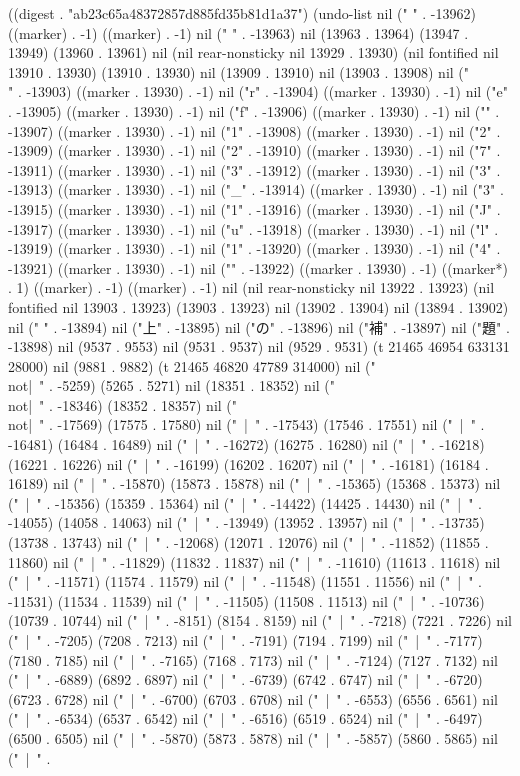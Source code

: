 
((digest . "ab23c65a48372857d885fd35b81d1a37") (undo-list nil ("
" . -13962) ((marker) . -1) ((marker) . -1) nil (" " . -13963) nil (13963 . 13964) (13947 . 13949) (13960 . 13961) nil (nil rear-nonsticky nil 13929 . 13930) (nil fontified nil 13910 . 13930) (13910 . 13930) nil (13909 . 13910) nil (13903 . 13908) nil ("\\" . -13903) ((marker . 13930) . -1) nil ("r" . -13904) ((marker . 13930) . -1) nil ("e" . -13905) ((marker . 13930) . -1) nil ("f" . -13906) ((marker . 13930) . -1) nil ("{" . -13907) ((marker . 13930) . -1) nil ("1" . -13908) ((marker . 13930) . -1) nil ("2" . -13909) ((marker . 13930) . -1) nil ("2" . -13910) ((marker . 13930) . -1) nil ("7" . -13911) ((marker . 13930) . -1) nil ("3" . -13912) ((marker . 13930) . -1) nil ("3" . -13913) ((marker . 13930) . -1) nil ("_" . -13914) ((marker . 13930) . -1) nil ("3" . -13915) ((marker . 13930) . -1) nil ("1" . -13916) ((marker . 13930) . -1) nil ("J" . -13917) ((marker . 13930) . -1) nil ("u" . -13918) ((marker . 13930) . -1) nil ("l" . -13919) ((marker . 13930) . -1) nil ("1" . -13920) ((marker . 13930) . -1) nil ("4" . -13921) ((marker . 13930) . -1) nil ("}" . -13922) ((marker . 13930) . -1) ((marker*) . 1) ((marker) . -1) ((marker) . -1) nil (nil rear-nonsticky nil 13922 . 13923) (nil fontified nil 13903 . 13923) (13903 . 13923) nil (13902 . 13904) nil (13894 . 13902) nil (" " . -13894) nil ("上" . -13895) nil ("の" . -13896) nil ("補" . -13897) nil ("題" . -13898) nil (9537 . 9553) nil (9531 . 9537) nil (9529 . 9531) (t 21465 46954 633131 28000) nil (9881 . 9882) (t 21465 46820 47789 314000) nil ("\\not|~" . -5259) (5265 . 5271) nil (18351 . 18352) nil ("\\not|~" . -18346) (18352 . 18357) nil ("\\not|~" . -17569) (17575 . 17580) nil ("~|~" . -17543) (17546 . 17551) nil ("~|~" . -16481) (16484 . 16489) nil ("~|~" . -16272) (16275 . 16280) nil ("~|~" . -16218) (16221 . 16226) nil ("~|~" . -16199) (16202 . 16207) nil ("~|~" . -16181) (16184 . 16189) nil ("~|~" . -15870) (15873 . 15878) nil ("~|~" . -15365) (15368 . 15373) nil ("~|~" . -15356) (15359 . 15364) nil ("~|~" . -14422) (14425 . 14430) nil ("~|~" . -14055) (14058 . 14063) nil ("~|~" . -13949) (13952 . 13957) nil ("~|~" . -13735) (13738 . 13743) nil ("~|~" . -12068) (12071 . 12076) nil ("~|~" . -11852) (11855 . 11860) nil ("~|~" . -11829) (11832 . 11837) nil ("~|~" . -11610) (11613 . 11618) nil ("~|~" . -11571) (11574 . 11579) nil ("~|~" . -11548) (11551 . 11556) nil ("~|~" . -11531) (11534 . 11539) nil ("~|~" . -11505) (11508 . 11513) nil ("~|~" . -10736) (10739 . 10744) nil ("~|~" . -8151) (8154 . 8159) nil ("~|~" . -7218) (7221 . 7226) nil ("~|~" . -7205) (7208 . 7213) nil ("~|~" . -7191) (7194 . 7199) nil ("~|~" . -7177) (7180 . 7185) nil ("~|~" . -7165) (7168 . 7173) nil ("~|~" . -7124) (7127 . 7132) nil ("~|~" . -6889) (6892 . 6897) nil ("~|~" . -6739) (6742 . 6747) nil ("~|~" . -6720) (6723 . 6728) nil ("~|~" . -6700) (6703 . 6708) nil ("~|~" . -6553) (6556 . 6561) nil ("~|~" . -6534) (6537 . 6542) nil ("~|~" . -6516) (6519 . 6524) nil ("~|~" . -6497) (6500 . 6505) nil ("~|~" . -5870) (5873 . 5878) nil ("~|~" . -5857) (5860 . 5865) nil ("~|~" . 
